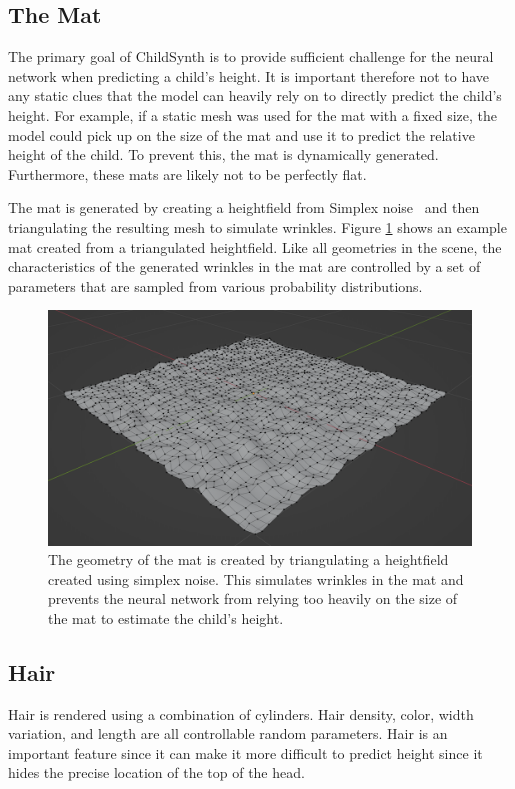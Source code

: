 \documentclass{article}
\begin{document}
\subsection{The Mat}

The primary goal of ChildSynth is to provide sufficient challenge for the neural network when predicting a child's height. It is important therefore not to have any static clues that the model can heavily rely on to directly predict the child's height. For example, if a static mesh was used for the mat with a fixed size, the model could pick up on the size of the mat and use it to predict the relative height of the child. To prevent this, the mat is dynamically generated. Furthermore, these mats are likely not to be perfectly flat. 

The mat is generated by creating a heightfield from Simplex noise~\cite{perlin2001improving} and then triangulating the resulting mesh to simulate wrinkles. Figure \ref{fig:mat} shows an example mat created from a triangulated heightfield. Like all geometries in the scene, the characteristics of the generated wrinkles in the mat are controlled by a set of parameters that are sampled from various probability distributions.

\begin{figure}[]
    \centering
    \includegraphics[width=.4\textwidth]{plots/mesh.png}
    \caption{The geometry of the mat is created by triangulating a heightfield created using simplex noise. This simulates wrinkles in the mat and prevents the neural network from relying too heavily on the size of the mat to estimate the child's height.}
    \label{fig:mat}
\end{figure}

\subsection{Hair}

Hair is rendered using a combination of cylinders. Hair density, color, width variation, and length are all controllable random parameters. Hair is an important feature since it can make it more difficult to predict height since it hides the precise location of the top of the head.
\end{document}
